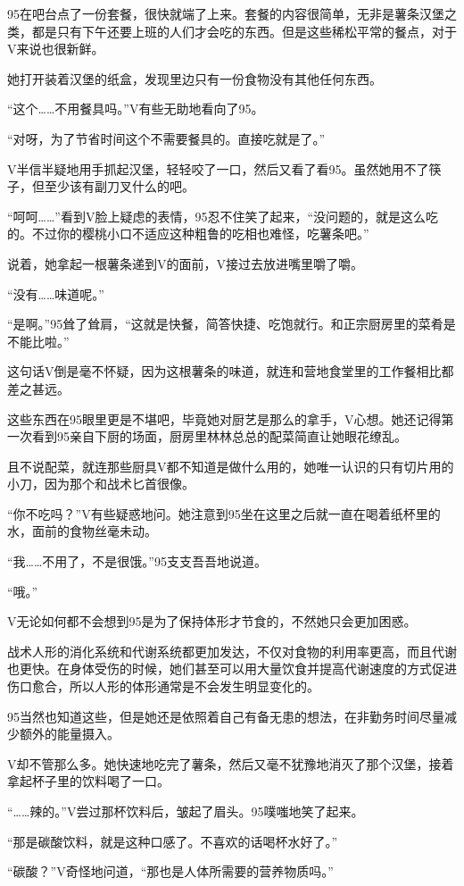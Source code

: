 95在吧台点了一份套餐，很快就端了上来。套餐的内容很简单，无非是薯条汉堡之类，都是只有下午还要上班的人们才会吃的东西。但是这些稀松平常的餐点，对于V来说也很新鲜。

她打开装着汉堡的纸盒，发现里边只有一份食物没有其他任何东西。

“这个……不用餐具吗。”V有些无助地看向了95。

“对呀，为了节省时间这个不需要餐具的。直接吃就是了。”

V半信半疑地用手抓起汉堡，轻轻咬了一口，然后又看了看95。虽然她用不了筷子，但至少该有副刀叉什么的吧。

“呵呵……”看到V脸上疑虑的表情，95忍不住笑了起来，“没问题的，就是这么吃的。不过你的樱桃小口不适应这种粗鲁的吃相也难怪，吃薯条吧。”

说着，她拿起一根薯条递到V的面前，V接过去放进嘴里嚼了嚼。

“没有……味道呢。”

“是啊。”95耸了耸肩，“这就是快餐，简答快捷、吃饱就行。和正宗厨房里的菜肴是不能比啦。”

这句话V倒是毫不怀疑，因为这根薯条的味道，就连和营地食堂里的工作餐相比都差之甚远。

这些东西在95眼里更是不堪吧，毕竟她对厨艺是那么的拿手，V心想。她还记得第一次看到95亲自下厨的场面，厨房里林林总总的配菜简直让她眼花缭乱。

且不说配菜，就连那些厨具V都不知道是做什么用的，她唯一认识的只有切片用的小刀，因为那个和战术匕首很像。

“你不吃吗？”V有些疑惑地问。她注意到95坐在这里之后就一直在喝着纸杯里的水，面前的食物丝毫未动。

“我……不用了，不是很饿。”95支支吾吾地说道。

“哦。”

V无论如何都不会想到95是为了保持体形才节食的，不然她只会更加困惑。

战术人形的消化系统和代谢系统都更加发达，不仅对食物的利用率更高，而且代谢也更快。在身体受伤的时候，她们甚至可以用大量饮食并提高代谢速度的方式促进伤口愈合，所以人形的体形通常是不会发生明显变化的。

95当然也知道这些，但是她还是依照着自己有备无患的想法，在非勤务时间尽量减少额外的能量摄入。

V却不管那么多。她快速地吃完了薯条，然后又毫不犹豫地消灭了那个汉堡，接着拿起杯子里的饮料喝了一口。

“……辣的。”V尝过那杯饮料后，皱起了眉头。95噗嗤地笑了起来。

“那是碳酸饮料，就是这种口感了。不喜欢的话喝杯水好了。”

“碳酸？”V奇怪地问道，“那也是人体所需要的营养物质吗。”

